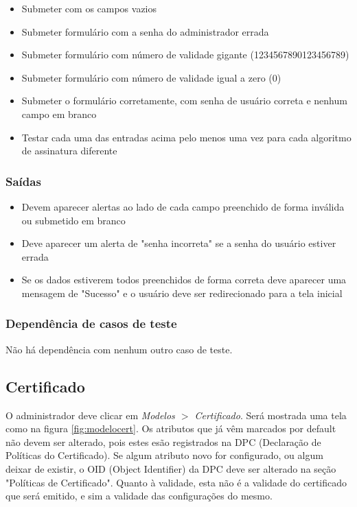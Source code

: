 \begin{itemize}

	\item Submeter com os campos vazios 
	\item Submeter formulário com a senha do administrador errada
	\item Submeter formulário com número de validade gigante (1234567890123456789)
	\item Submeter formulário com número de validade igual a zero (0)
	\item Submeter o formulário corretamente, com senha de usuário correta e nenhum campo em branco
	\item Testar cada uma das entradas acima pelo menos uma vez para cada algoritmo de assinatura diferente
\end{itemize}

\subsubsection{Saídas}

\begin{itemize}

	\item Devem aparecer alertas ao lado de cada campo preenchido de forma inválida ou submetido em branco
	\item Deve aparecer um alerta de "senha incorreta" se a senha do usuário estiver errada
	\item Se os dados estiverem todos preenchidos de forma correta deve aparecer uma mensagem de "Sucesso" e o usuário deve ser redirecionado para a tela inicial
	
\end{itemize}

\subsubsection{Dependência de casos de teste}
Não há dependência com nenhum outro caso de teste.

\subsection{Certificado}

O administrador deve clicar em \textit{Modelos $>$ Certificado}. Será mostrada uma tela como na figura \ref{fig:modelocert}. Os atributos que já vêm marcados por default não devem ser alterado, pois estes esão registrados na DPC (Declaração de Políticas do Certificado). Se algum atributo novo for configurado, ou algum deixar de existir, o OID (Object Identifier) da DPC deve ser alterado na seção "Políticas de Certificado". Quanto à validade, esta não é a validade do certificado que será emitido, e sim a validade das configurações do mesmo.


